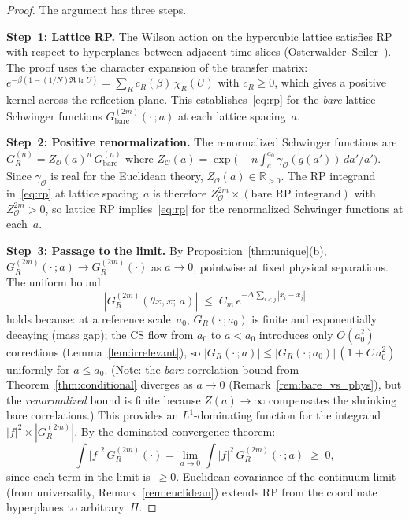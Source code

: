 \documentclass[11pt,a4paper]{article}
\theoremstyle{plain}
\theoremstyle{definition}
\theoremstyle{remark}
\newcommand{\R}{\mathbb{R}}
\newcommand{\tr}{\operatorname{tr}}
\begin{document}
\begin{proof}
The argument has three steps.

\smallskip
\noindent\textbf{Step~1: Lattice RP.}
The Wilson action on the hypercubic lattice satisfies RP
with respect to hyperplanes between adjacent time-slices
(Osterwalder--Seiler~\cite{OsterwalderSeiler78}).
The proof uses the character expansion of the transfer
matrix: $e^{-\beta(1 - (1/N)\Re\tr U)}
= \sum_R c_R(\beta)\,\chi_R(U)$ with $c_R \geq 0$,
which gives a positive kernel across the reflection
plane.  This establishes~\eqref{eq:rp} for the
\emph{bare} lattice Schwinger functions $G_{\mathrm{bare}}^{(2m)}(\cdot\,;a)$
at each lattice spacing~$a$.

\smallskip
\noindent\textbf{Step~2: Positive renormalization.}
The renormalized Schwinger functions are
$G_R^{(n)} = Z_\mathcal{O}(a)^n\,G_{\mathrm{bare}}^{(n)}$
where $Z_\mathcal{O}(a)
= \exp\!\bigl(-n\!\int_a^{a_0}\!\gamma_\mathcal{O}
(g(a'))\,da'/a'\bigr)$.
Since $\gamma_\mathcal{O}$ is real for the Euclidean
theory, $Z_\mathcal{O}(a) \in \R_{>0}$.
The RP integrand in~\eqref{eq:rp} at lattice
spacing~$a$ is therefore
$Z_\mathcal{O}^{2m} \times (\text{bare RP integrand})$
with $Z_\mathcal{O}^{2m} > 0$, so lattice RP
implies~\eqref{eq:rp} for the renormalized Schwinger
functions at each~$a$.

\smallskip
\noindent\textbf{Step~3: Passage to the limit.}
By Proposition~\ref{thm:unique}(b), $G_R^{(2m)}(\cdot\,;a)
\to G_R^{(2m)}(\cdot)$ as $a \to 0$, pointwise at fixed
physical separations.  The uniform bound
\begin{equation}
  |G_R^{(2m)}(\theta x, x;\, a)|
  \;\leq\; C_m\,e^{-\Delta\,\sum_{i<j}|x_i - x_j|}
\end{equation}
holds because: at a reference scale~$a_0$, $G_R(\cdot\,;a_0)$
is finite and exponentially decaying (mass gap); the CS
flow from $a_0$ to $a < a_0$ introduces only $O(a_0^2)$
corrections (Lemma~\ref{lem:irrelevant}), so
$|G_R(\cdot\,;a)| \leq |G_R(\cdot\,;a_0)|\,(1 + C\,a_0^2)$
uniformly for $a \leq a_0$.
\textup{(}Note: the \emph{bare} correlation bound from
Theorem~\ref{thm:conditional} diverges as $a \to 0$
(Remark~\ref{rem:bare_vs_phys}), but the \emph{renormalized}
bound is finite because $Z(a) \to \infty$ compensates
the shrinking bare correlations.\textup{)}
This provides an $L^1$-dominating function
for the integrand $|f|^2 \times |G_R^{(2m)}|$.
By the dominated convergence theorem:
\begin{equation}
  \int |f|^2 \,G_R^{(2m)}(\cdot)
  = \lim_{a \to 0} \int |f|^2\,G_R^{(2m)}(\cdot\,;a)
  \;\geq\; 0,
\end{equation}
since each term in the limit is~$\geq 0$.
Euclidean covariance of the continuum limit (from
universality, Remark~\ref{rem:euclidean}) extends RP
from the coordinate hyperplanes to arbitrary~$\Pi$.
\end{proof}
\end{document}
